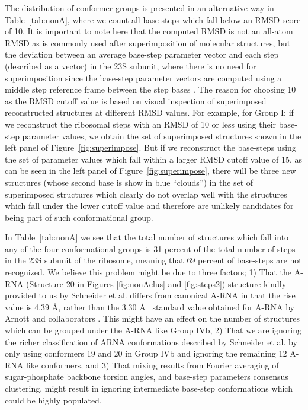 The distribution  of conformer groups  is presented in  an alternative
way in Table~\ref{tab:nonA}, where  we count all base-steps which fall
below an  RMSD score  of 10.  It  is important  to note here  that the
computed  RMSD is  not  an all-atom  RMSD  as is  commonly used  after
superimposition of molecular structures,  but the deviation between an
average  base-step parameter  vector  and each  step  (described as  a
vector) in the 23S subunit, where there is no need for superimposition
since the base-step parameter vectors are computed using a middle step
reference frame between the step bases \cite{lu2003}.  The reason for
choosing 10 as the RMSD cutoff  value is based on visual inspection of
superimposed  reconstructed structures at  different RMSD  values. For
example, for  Group I; if we  reconstruct the ribosomal  steps with an
RMSD of 10  or less using their base-step  parameter values, we obtain
the  set  of  superimposed  structures  shown in  the  left  panel  of
Figure~\ref{fig:superimpose}.   But if  we reconstruct  the base-steps
using  the set of  parameter values  which fall  within a  larger RMSD
cutoff  value   of  15,  as  can   be  seen  in  the   left  panel  of
Figure~\ref{fig:superimpose},  there  will  be  three  new  structures
(whose  second  base  is  show  in  blue ``clouds'')  in  the  set  of
superimposed  structures which clearly  do not  overlap well  with the
structures which fall  under the lower cutoff value  and therefore are
unlikely candidates for being part of such conformational group.
  
In  Table~\ref{tab:nonA} we see  that the  total number  of structures
which fall into any of the four conformational groups is 31 percent of
the total number of steps in  the 23S subunit of the ribosome, meaning
that  69 percent  of base-steps  are not  recognized. We  believe this
problem might be due to three factors; 1) That the A-RNA (Structure 20
in Figures \ref{fig:nonAclus} and \ref{fig:steps2}) structure kindly
provided to  us by Schneider et  al.  differs from  canonical A-RNA in
that the  rise value is 4.39  \AA, rather than the  3.30 \AA~ standard
value    obtained   for    A-RNA   by    Arnott    and   collaborators
\cite{arnott1973}.   This  might  have  an  effect on  the  number  of
structures which  can be  grouped under the  A-RNA like Group  IVb, 2)
That we  are ignoring the richer classification  of ARNA conformations
described  by Schneider  et  al.  \cite{schneider2004}  by only  using
conformers 19 and 20 in Group  IVb and ignoring the remaining 12 A-RNA
like conformers, and 3) That  mixing results from Fourier averaging of
sugar-phosphate  backbone  torsion  angles, and  base-step  parameters
consensus clustering, might result in  ignoring intermediate base-step
conformations which could be highly populated.


